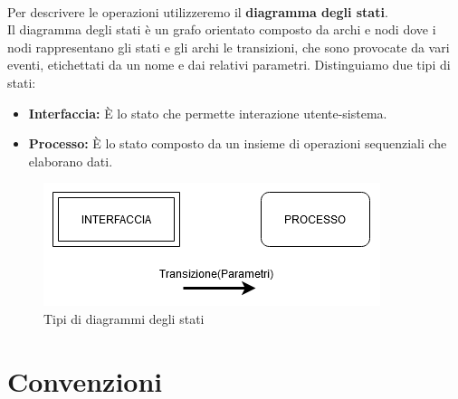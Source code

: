 \documentclass[a4paper, 12pt]{report}
\begin{document}
            \paragraph{}Per descrivere le operazioni utilizzeremo il \textbf{diagramma degli stati}.\\
            Il diagramma degli stati è un grafo orientato composto da archi e nodi dove i nodi rappresentano gli stati
            e gli archi le transizioni, che sono provocate da vari eventi, etichettati da un nome e dai relativi parametri.
            Distinguiamo due tipi di stati:
            \begin{itemize}
                \item \textbf{Interfaccia:} È lo stato che permette interazione utente-sistema.
                \item \textbf{Processo:} È lo stato composto da un insieme di operazioni sequenziali che elaborano dati.
            \end{itemize}  
            \begin{figure}[htbt]
                \centering
                \includegraphics[scale=0.8]{Immagini/elementiDiagrammi.png}
                \caption{Tipi di diagrammi degli stati}
            \end{figure}
        \clearpage
        \section{Convenzioni}
\end{document}

